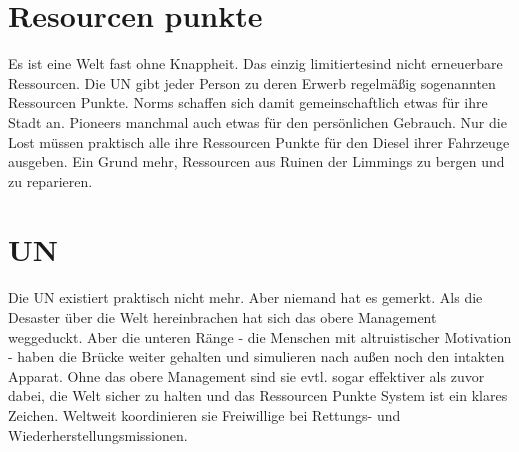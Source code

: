 \section{Resourcen punkte}
\label{sec:Resource Points}

Es ist eine Welt fast ohne Knappheit. Das einzig limitiertesind nicht erneuerbare Ressourcen. Die UN gibt jeder Person zu deren Erwerb regelmäßig sogenannten Ressourcen Punkte. Norms schaffen sich damit gemeinschaftlich etwas für ihre Stadt an. Pioneers manchmal auch etwas für den persönlichen Gebrauch. Nur die Lost müssen praktisch alle ihre Ressourcen Punkte für den Diesel ihrer Fahrzeuge ausgeben. Ein Grund mehr, Ressourcen aus Ruinen der Limmings zu bergen und zu reparieren.

\section{UN}
\label{sec:UN}

Die UN existiert praktisch nicht mehr. Aber niemand hat es gemerkt. Als die Desaster über die Welt hereinbrachen hat sich das obere Management weggeduckt. Aber die unteren Ränge - die Menschen mit altruistischer Motivation - haben die Brücke weiter gehalten und simulieren nach außen noch den intakten Apparat. Ohne das obere Management sind sie evtl. sogar effektiver als zuvor dabei, die Welt sicher zu halten und das Ressourcen Punkte System ist ein klares Zeichen. Weltweit koordinieren sie Freiwillige bei Rettungs- und Wiederherstellungsmissionen.
